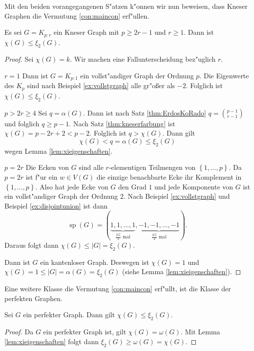 Mit den beiden vorangegangenen S"atzen k"onnen wir nun beweisen, dass Kneser Graphen die Vermutung \ref{con:maincon} erf"ullen.
\begin{proposition}
  Es sei $G=K_{p:r}$ ein Kneser Graph mit $p\geq 2r-1$ und $r \geq 1$. Dann ist $\chi(G) \leq \xi_{2}(G)$. 
\end{proposition}
\begin{proof}
  Sei $\chi(G) = k$. Wir machen eine Fallunterscheidung bez"uglich $r$.

   {$r=1$} Dann ist $G=K_{p:1}$ ein vollst"andiger Graph der Ordnung $p$. Die Eigenwerte des $K_p$ sind nach Beispiel \ref{ex:vollstgraph} alle gr"o{\ss}er als $-2$. Folglich ist $\chi(G) \leq \xi_{2}(G)$. 

   {$p > 2r \geq 4 $} Sei $q = \alpha(G)$.  Dann ist nach Satz \ref{thm:ErdosKoRado} $ q = \binom{p-1}{r-1}$ und folglich $ q \geq p-1$. Nach Satz \ref{thm:kneserfarbung} ist $\chi(G) = p-2r+2 < p-2$. Folglich ist $q > \chi(G)$. 
  Dann gilt $$\chi(G) < q = \alpha(G) \leq \xi_{2}(G) $$ wegen Lemma \ref{lem:xieigenschaften}.

   {$ p = 2r $} Die Ecken von $G$ sind alle $r$-elementigen Teilmengen von $\left\{ 1,\dots,p \right\}$. Da $p=2r$ ist f"ur ein $w\in V(G)$ die einzige benachbarte Ecke ihr Komplement in $\left\{ 1,\dots,p \right\}$. 
  Also hat jede Ecke von $G$ den Grad $1$ und jede Komponente von $G$ ist ein vollst"andiger Graph der Ordnung $2$.
  Nach Beispiel \ref{ex:vollstgraph} und Beispiel \ref{ex:disjointunion} ist dann 
$$\operatorname{sp} (G) = (\underbrace{1,1,\dots,1}_{\frac{|G|}{2} \text{ mal}} , \underbrace{-1,-1,\dots,-1}_{\frac{|G|}{2} \text{ mal}}). $$
Daraus folgt dann $\chi(G) \leq |G| = \xi_{2}(G)$.

 Dann ist $G$ ein kantenloser Graph. Deswegen ist $\chi(G) = 1$ und $\chi(G) = 1 \leq |G| = \alpha(G) = \xi_{2}(G)$ (siehe Lemma \ref{lem:xieigenschaften}).
\end{proof}
Eine weitere Klasse die Vermutung \ref{con:maincon} erf"ullt, ist die Klasse der perfekten Graphen.

\begin{proposition}
  Sei $G$ ein perfekter Graph. Dann gilt 
  $\chi(G) \leq \xi_{2}(G)$.
\end{proposition}

\begin{proof}
  Da $G$ ein perfekter Graph ist, gilt $\chi(G) = \omega(G)$. 
  Mit Lemma \ref{lem:xieigenschaften} folgt dann $\xi_2(G) \geq \omega(G) = \chi(G)$.
\end{proof}

